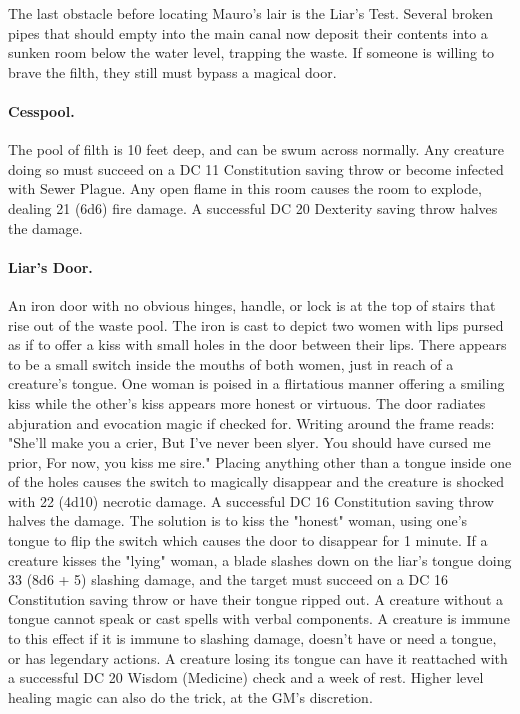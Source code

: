 \documentclass[10pt,a4paper,twoside,twocolumn,openany,bg=print,nodeprecatedcode]{dndbook}
\begin{document}
The last obstacle before locating Mauro's lair is the Liar's Test. Several broken pipes that should empty into the main canal now deposit their contents into a sunken room below the water level, trapping the waste. If someone is willing to brave the filth, they still must bypass a magical door.
\paragraph{Cesspool.}
The pool of filth is 10 feet deep, and can be swum across normally. Any creature doing so must succeed on a DC 11 Constitution saving throw or become infected with Sewer Plague. Any open flame in this room causes the room to explode, dealing 21 (6d6) fire damage. A successful DC 20 Dexterity saving throw halves the damage.
\paragraph{Liar's Door.}
An iron door with no obvious hinges, handle, or lock is at the top of stairs that rise out of the waste pool. The iron is cast to depict two women with lips pursed as if to offer a kiss with small holes in the door between their lips. There appears to be a small switch inside the mouths of both women, just in reach of a creature's tongue. One woman is poised in a flirtatious manner offering a smiling kiss while the other's kiss appears more honest or virtuous. The door radiates abjuration and evocation magic if checked for.
Writing around the frame reads: "She'll make you a crier, But I've never been slyer. You should have cursed me prior, For now, you kiss me sire." Placing anything other than a tongue inside one of the holes causes the switch to magically disappear and the creature is shocked with 22 (4d10) necrotic damage. A successful DC 16 Constitution saving throw halves the damage. The solution is to kiss the "honest" woman, using one's tongue to flip the switch which causes the door to disappear for 1 minute. If a creature kisses the "lying" woman, a blade slashes down on the liar's tongue doing 33 (8d6 + 5) slashing damage, and the target must succeed on a DC 16 Constitution saving throw or have their tongue ripped out. A creature without a tongue cannot speak or cast spells with verbal components. A creature is immune to this effect if it is immune to slashing damage, doesn't have or need a tongue, or has legendary actions. A creature losing its tongue can have it reattached with a successful DC 20 Wisdom (Medicine) check and a week of rest. Higher level healing magic can also do the trick, at the GM's discretion.
\end{document}
